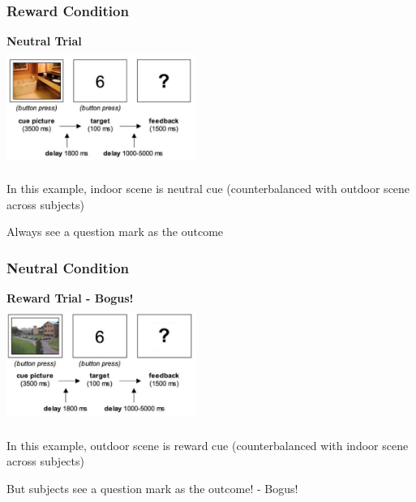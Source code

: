 \documentclass{beamer}
\begin{document}
\begin{frame}
\frametitle{Reward Condition}
\begin{center}
\bf{Neutral Trial} \\
	\includegraphics[height=38mm,width=62mm]{neutralcond} \\
	\begin{itemize}
		\footnotesize{
		\item  In this example, indoor scene is neutral cue (counterbalanced with outdoor scene across subjects)
		\item Always see a question mark as the outcome }
	\end{itemize}
\end{center}
\end{frame}

\begin{frame}
\frametitle{Neutral Condition}
\begin{center}
\bf{Reward Trial - Bogus!} \\
	\includegraphics[height=38mm,width=62mm]{bogusrewardcond} \\
	\begin{itemize}
		\footnotesize{
		\item In this example, outdoor scene is reward cue (counterbalanced with indoor scene across subjects)
		\item But subjects see a question mark as the outcome! - Bogus! }
	\end{itemize}
\end{center}
\end{frame}
\end{document}
